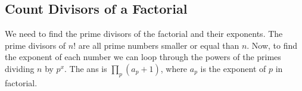 \documentclass[12pt]{article}%
\begin{document}
\subsection{Count Divisors of a Factorial}

We need to find the prime divisors of the factorial and their exponents. The prime divisors of $n!$ are all prime numbers smaller or equal than $n$. Now, to find the exponent of each number we can loop through the powers of the primes dividing $n$ by $p^x$. The ans is $\prod_{p} (a_p+1)$, where $a_p$ is the exponent of $p$ in factorial.
\end{document}
